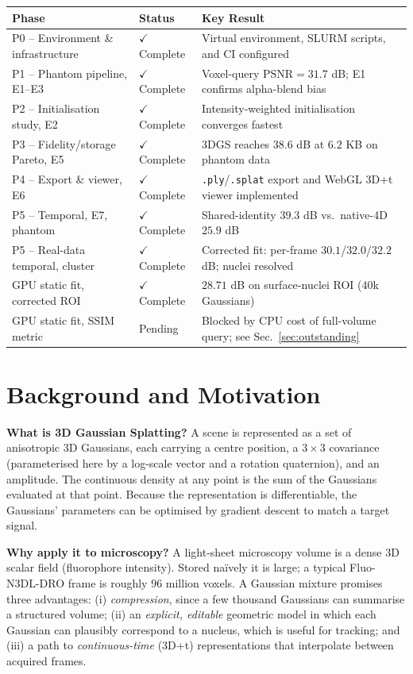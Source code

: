 \documentclass[11pt,a4paper]{article}
\newcommand{\done}{\textcolor{green!45!black}{\(\checkmark\) Complete}}
\newcommand{\pending}{\textcolor{orange!80!black}{Pending}}
\newcommand{\phantomcomplete}{\textcolor{green!45!black}{\(\checkmark\) Complete}}
\newcommand{\code}[1]{\texttt{#1}}
\newcommand{\psnr}{\mathrm{PSNR}}
\begin{document}
\begin{table}[h!]
\centering
\small
\begin{tabularx}{\textwidth}{@{}p{}p{}X@{}}
\toprule
\textbf{Phase} & \textbf{Status} & \textbf{Key Result} \\
\midrule
P0 -- Environment \& infrastructure & \done & Virtual environment, SLURM scripts, and CI configured \\
P1 -- Phantom pipeline, E1--E3 & \done & Voxel-query \(\psnr = 31.7\) dB; E1 confirms alpha-blend bias \\
P2 -- Initialisation study, E2 & \done & Intensity-weighted initialisation converges fastest \\
P3 -- Fidelity/storage Pareto, E5 & \done & 3DGS reaches \(38.6\) dB at \(6.2\) KB on phantom data \\
P4 -- Export \& viewer, E6 & \done & \code{.ply}/\code{.splat} export and WebGL 3D+t viewer implemented \\
P5 -- Temporal, E7, phantom & \phantomcomplete & Shared-identity \(39.3\) dB vs.\ native-4D \(25.9\) dB \\
P5 -- Real-data temporal, cluster & \done & Corrected fit: per-frame \(30.1\)/\(32.0\)/\(32.2\) dB; nuclei resolved \\
GPU static fit, corrected ROI & \done & \(28.71\) dB on surface-nuclei ROI (40k Gaussians) \\
GPU static fit, SSIM metric & \pending & Blocked by CPU cost of full-volume query; see Sec.~\ref{sec:outstanding} \\
\bottomrule
\end{tabularx}
\end{table}

\section{Background and Motivation}

\textbf{What is 3D Gaussian Splatting?}
A scene is represented as a set of anisotropic 3D Gaussians, each carrying a centre
position, a \(3\times3\) covariance (parameterised here by a log-scale vector and a
rotation quaternion), and an amplitude. The continuous density at any point is the sum
of the Gaussians evaluated at that point. Because the representation is differentiable,
the Gaussians' parameters can be optimised by gradient descent to match a target signal.

\textbf{Why apply it to microscopy?}
A light-sheet microscopy volume is a dense 3D scalar field (fluorophore intensity).
Stored na\"ively it is large; a typical Fluo-N3DL-DRO frame is roughly \(96\) million
voxels. A Gaussian mixture promises three advantages: (i) \emph{compression}, since a
few thousand Gaussians can summarise a structured volume; (ii) an \emph{explicit,
editable} geometric model in which each Gaussian can plausibly correspond to a nucleus,
which is useful for tracking; and (iii) a path to \emph{continuous-time} (3D+t)
representations that interpolate between acquired frames.
\end{document}
